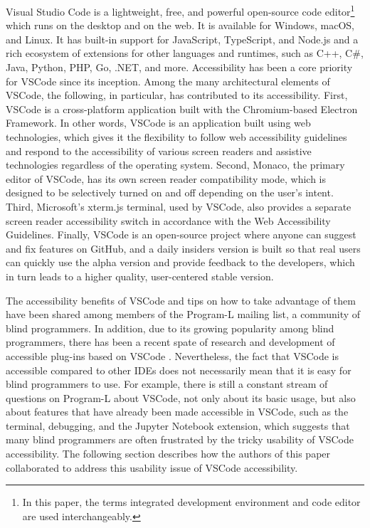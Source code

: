 \documentclass[sigconf]{acmart}
\begin{document}
Visual Studio Code is a lightweight, free, and powerful open-source code
editor\footnote{In this paper, the terms integrated development
  environment and code editor are used interchangeably.} which runs on
the desktop and on the web. It is available for Windows, macOS, and
Linux. It has built-in support for JavaScript, TypeScript, and Node.js
and a rich ecosystem of extensions for other languages and runtimes,
such as C++, C\#, Java, Python, PHP, Go, .NET, and more. Accessibility
has been a core priority for VSCode since its inception. Among the many
architectural elements of VSCode, the following, in particular, has
contributed to its accessibility. First, VSCode is a cross-platform
application built with the Chromium-based Electron Framework. In other
words, VSCode is an application built using web technologies, which
gives it the flexibility to follow web accessibility guidelines and
respond to the accessibility of various screen readers and assistive
technologies regardless of the operating system. Second, Monaco, the
primary editor of VSCode, has its own screen reader compatibility mode,
which is designed to be selectively turned on and off depending on the
user's intent. Third, Microsoft's xterm.js terminal, used by VSCode,
also provides a separate screen reader accessibility switch in
accordance with the Web Accessibility Guidelines. Finally, VSCode is an
open-source project where anyone can suggest and fix features on GitHub,
and a daily insiders version is built so that real users can quickly use
the alpha version and provide feedback to the developers, which in turn
leads to a higher quality, user-centered stable version.

The accessibility benefits of VSCode and tips on how to take advantage
of them have been shared among members of the Program-L mailing list, a
community of blind programmers. In addition, due to its growing
popularity among blind programmers, there has been a recent spate of
research and development of accessible plug-ins based on VSCode
\citep{potluriCodeWalkFacilitatingShared2022, stogerDesigningInclusiveAccessible2022}.
Nevertheless, the fact that VSCode is accessible compared to other IDEs
does not necessarily mean that it is easy for blind programmers to use.
For example, there is still a constant stream of questions on Program-L
about VSCode, not only about its basic usage, but also about features
that have already been made accessible in VSCode, such as the terminal,
debugging, and the Jupyter Notebook extension, which suggests that many
blind programmers are often frustrated by the tricky usability of VSCode
accessibility. The following section describes how the authors of this
paper collaborated to address this usability issue of VSCode
accessibility.
\end{document}

